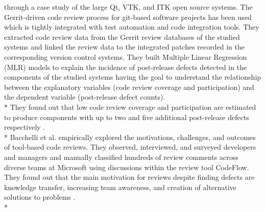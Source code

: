through a case study of the large Qt, VTK, and ITK open source systems. The Gerrit-driven code review process for git-based software projects has been used which is tightly integrated with test automation and code integration tools. They extracted code review data from the Gerrit review databases of the studied systems and linked the review data to the integrated patches recorded in the corresponding version control systems. They built Multiple Linear Regression (MLR) models to explain the incidence of post-release defects detected in the components of the studied systems having the goal to understand the relationship between the explanatory variables (code review coverage and participation) and the dependent variable (post-release defect counts). \\*
They found out that low code review coverage and participation are estimated to produce components with up to two and five additional post-release defects respectively \cite{McIntosh:2014:ICR:2597073.2597076}. \\*
Bacchelli et al. empirically explored the motivations, challenges, and outcomes of tool-based code reviews. They observed, interviewed, and surveyed developers and managers and manually classified hundreds of review comments across diverse teams at Microsoft using discussions within the review tool CodeFlow. They found out that the main motivation for reviews despite finding defects are knowledge transfer, increasing team awareness, and creation of alternative solutions to problems \cite{Bacchelli:2013:EOC:2486788.2486882}. \\*
